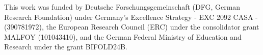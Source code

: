 This work was funded by Deutsche Forschungsgemeinschaft (DFG, German Research Foundation) under Germany’s Excellence Strategy - EXC 2092 CASA - (390781972), the European Research Council (ERC) under the consolidator grant MALFOY (101043410), and the German Federal Ministry of Education and Research under the grant BIFOLD24B.